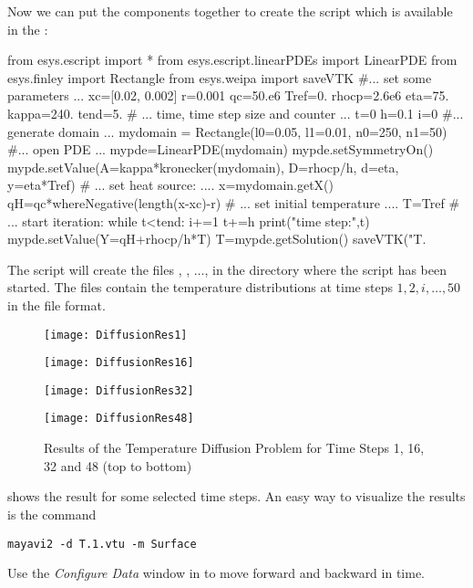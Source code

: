 Now we can put the components together to create the script 
which is available in the \ExampleDirectory{}:
\begin{python}
  from esys.escript import *
  from esys.escript.linearPDEs import LinearPDE
  from esys.finley import Rectangle
  from esys.weipa import saveVTK
  #... set some parameters ...
  xc=[0.02, 0.002]
  r=0.001
  qc=50.e6
  Tref=0.
  rhocp=2.6e6
  eta=75.
  kappa=240.
  tend=5.
  # ... time, time step size and counter ...
  t=0
  h=0.1
  i=0
  #... generate domain ...
  mydomain = Rectangle(l0=0.05, l1=0.01, n0=250, n1=50)
  #... open PDE ...
  mypde=LinearPDE(mydomain)
  mypde.setSymmetryOn()
  mypde.setValue(A=kappa*kronecker(mydomain), D=rhocp/h, d=eta, y=eta*Tref)
  # ... set heat source: ....
  x=mydomain.getX()
  qH=qc*whereNegative(length(x-xc)-r)
  # ... set initial temperature ....
  T=Tref
  # ... start iteration:
  while t<tend:
        i+=1
        t+=h
        print("time step:",t)
        mypde.setValue(Y=qH+rhocp/h*T)
        T=mypde.getSolution()
        saveVTK("T.%
\end{python}
The script will create the files , , $\ldots$,
 in the directory where the script has been started.
The files contain the temperature distributions at time steps $1, 2, i,
\ldots, 50$ in the \VTK file format.

\begin{figure}
\centerline{\texttt{[image: DiffusionRes1]}}
\centerline{\texttt{[image: DiffusionRes16]}}
\centerline{\texttt{[image: DiffusionRes32]}}
\centerline{\texttt{[image: DiffusionRes48]}}
\caption{Results of the Temperature Diffusion Problem for Time Steps 1, 16, 32
         and 48 (top to bottom)}
\label{DIFFUSION FIG 2}
\end{figure}
 shows the result for some selected time steps.
An easy way to visualize the results is the command
\begin{verbatim}
mayavi2 -d T.1.vtu -m Surface
\end{verbatim}
Use the \emph{Configure Data} window in \mayavi to move forward and backward in time.

